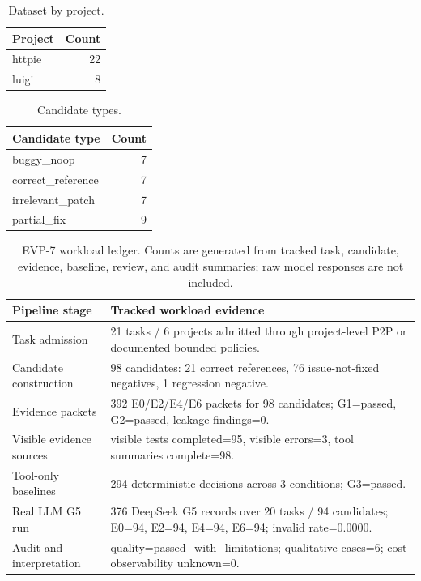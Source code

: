 
\begin{table}[t]
\centering
\caption{Dataset by project.}
\label{tab:dataset-projects}
\begin{tabular}{lr}
\toprule
Project & Count \\
\midrule
httpie & 22 \\
luigi & 8 \\
\bottomrule
\end{tabular}
\end{table}


\begin{table}[t]
\centering
\caption{Candidate types.}
\label{tab:candidate-types}
\begin{tabular}{lr}
\toprule
Candidate type & Count \\
\midrule
buggy\_noop & 7 \\
correct\_reference & 7 \\
irrelevant\_patch & 7 \\
partial\_fix & 9 \\
\bottomrule
\end{tabular}
\end{table}


\begin{table}[t]
\centering
\caption{EVP-7 workload ledger. Counts are generated from tracked task, candidate, evidence, baseline, review, and audit summaries; raw model responses are not included.}
\label{tab:evp7-workload-ledger}
\begin{tabular}{p{}p{}}
\toprule
Pipeline stage & Tracked workload evidence \\
\midrule
Task admission & 21 tasks / 6 projects admitted through project-level P2P or documented bounded policies. \\
Candidate construction & 98 candidates: 21 correct references, 76 issue-not-fixed negatives, 1 regression negative. \\
Evidence packets & 392 E0/E2/E4/E6 packets for 98 candidates; G1=passed, G2=passed, leakage findings=0. \\
Visible evidence sources & visible tests completed=95, visible errors=3, tool summaries complete=98. \\
Tool-only baselines & 294 deterministic decisions across 3 conditions; G3=passed. \\
Real LLM G5 run & 376 DeepSeek G5 records over 20 tasks / 94 candidates; E0=94, E2=94, E4=94, E6=94; invalid rate=0.0000. \\
Audit and interpretation & quality=passed\_with\_limitations; qualitative cases=6; cost observability unknown=0. \\
\bottomrule
\end{tabular}
\end{table}


